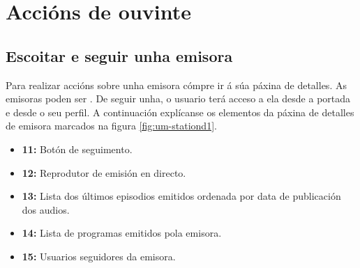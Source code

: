 \section{Accións de ouvinte}

\subsection{Escoitar e seguir unha emisora}

Para realizar accións sobre unha emisora cómpre ir á súa páxina de detalles. As emisoras poden ser . De seguir unha, o usuario terá acceso a ela desde a portada e desde o seu perfil. A continuación explícanse os elementos da páxina de detalles de emisora marcados na figura \ref{fig:um-stationd1}.

\begin{itemize}
	\item \textbf{11:} Botón de seguimento.
	\item \textbf{12:} Reprodutor de emisión en directo.
	\item \textbf{13:} Lista dos últimos episodios emitidos ordenada por data de publicación dos audios.
	\item \textbf{14:} Lista de programas emitidos pola emisora.
	\item \textbf{15:} Usuarios seguidores  da emisora.
\end{itemize}

